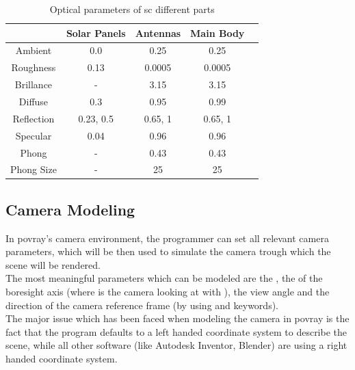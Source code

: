 \begin{table}[H]
\centering
\begin{tabular}{c cccc}
\hline 
\hline
 & Solar Panels & Antennas & Main Body \\ 
\hline 
Ambient & 0.0 & 0.25 & 0.25 \\ 
Roughness & 0.13 & 0.0005 & 0.0005 \\ 
Brillance & - & 3.15 & 3.15 \\
Diffuse & 0.3 & 0.95 & 0.99 \\ 
Reflection & {0.23, 0.5} & {0.65, 1} & {0.65, 1} \\ 
Specular & 0.04 & 0.96 & 0.96 \\
Phong & - & 0.43 & 0.43 \\
Phong Size & - & 25 & 25 \\
\hline
\hline
\end{tabular}
\caption{Optical parameters of \acrshort{sc} different parts}
\label{tab:SCParameters} 
\end{table}

\subsection{Camera Modeling}
In \acrshort{povray}'s camera environment, the programmer can set all relevant camera parameters, which will be then used to simulate the camera trough which the scene will be rendered.\\
The most meaningful parameters which can be modeled are the , the  of the boresight axis (where is the
camera looking at with ), the view angle and the direction of the camera reference frame (by using  and  keywords).\\
The major issue which has been faced when modeling the camera in \acrshort{povray} is the fact that the program defaults to a left handed coordinate system to describe the scene, while all other software (like Autodesk Inventor, Blender) are using a right handed coordinate system.

